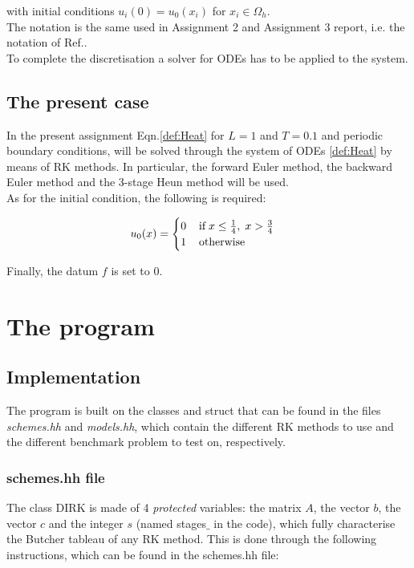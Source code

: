 \documentclass[11pt]{article}
\theoremstyle{theorem}
\theoremstyle{definition}
\begin{document}
with initial conditions $u_i(0)=u_0(x_i)$ for $x_i\in\Omega_h$.\\
The notation is the same used in Assignment 2 and Assignment 3 report, i.e. the notation of Ref.\cite{lec-notes}.\\
To complete the discretisation a solver for ODEs has to be applied to the system.\\

\subsection{The present case}
In the present assignment Eqn.\eqref{def:Heat} for $L=1$ and $T=0.1$ and periodic boundary conditions, will be solved through the system of ODEs \eqref{def:Heat} by means of RK methods. In particular, the forward Euler method, the backward Euler method and the 3-stage Heun method will be used.\\
As for the initial condition, the following is required:

\begin{align}
\label{eqn:init-cond}
u_0(x)=
	\begin{cases}
	0\hspace{4mm}\text{if}\hspace{1mm} x\le\frac{1}{4},\hspace{1mm}x>\frac{3}{4}\\
	1\hspace{4mm}\text{otherwise}
	\end{cases}
\end{align}

Finally, the datum $f$ is set to $0$.\\


\section{The program}
\subsection{Implementation}
The program is built on the classes and struct that can be found in the files \emph{schemes.hh} and \emph{models.hh}, which contain the different RK methods to use and the different benchmark problem to test on, respectively.\\
\subsubsection{schemes.hh file}
\label{subsubsec:schemes}
The class DIRK is made of 4 \emph{protected} variables: the matrix $A$, the vector $b$, the vector $c$ and the integer $s$ (named stages$\_$ in the code), which fully characterise the Butcher tableau of any RK method. This is done through the following instructions, which can be found in the schemes.hh file:
\end{document}
